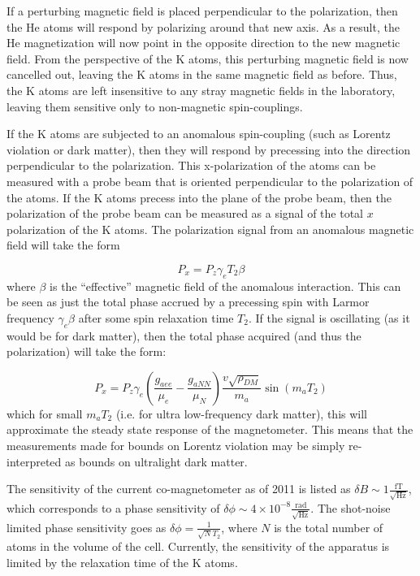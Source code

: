 \documentclass[aps,prd,final,letterpaper]{revtex4}
\begin{document}
If a perturbing magnetic field is placed perpendicular to the polarization, then the He atoms will respond by polarizing around that new axis. As a result, the He magnetization will now point in the opposite direction to the new magnetic field. From the perspective of the K atoms, this perturbing magnetic field is now cancelled out, leaving the K atoms in the same magnetic field as before. Thus, the K atoms are left insensitive to any stray magnetic fields in the laboratory, leaving them sensitive only to non-magnetic spin-couplings. 

If the K atoms are subjected to an anomalous spin-coupling (such as Lorentz violation or dark matter), then they will respond by precessing into the direction perpendicular to the polarization. This x-polarization of the atoms can be measured with a probe beam that is oriented perpendicular to the polarization of the atoms. If the K atoms precess into the plane of the probe beam, then the polarization of the probe beam can be measured as a signal of the total $x$ polarization of the K atoms. The polarization signal from an anomalous magnetic field will take the form 

\begin{equation}
P_x = P_z\gamma_e T_2\beta
\end{equation}
where $\beta$ is the ``effective'' magnetic field of the anomalous interaction. This can be seen as just the total phase accrued by a precessing spin with Larmor frequency $\gamma_e \beta$ after some spin relaxation time $T_2$. If the signal is oscillating (as it would be for dark matter), then the total phase acquired (and thus the polarization) will take the form:

\begin{equation}
P_x = P_z\gamma_e \left(\frac{g_{aee}}{\mu_e} - \frac{g_{aNN}}{\mu_N}\right)\frac{v\sqrt{\rho_{DM}}}{m_a}\sin{(m_a T_2)}
\end{equation}
which for small $m_a T_2$ (i.e. for ultra low-frequency dark matter), this will approximate the steady state response of the magnetometer. This means that the measurements made for bounds on Lorentz violation may be simply re-interpreted as bounds on ultralight dark matter. 

The sensitivity of the current co-magnetometer as of 2011 is listed as $\delta B \sim 1 \frac{\mathrm{fT}}{\sqrt{\mathrm{Hz}}}$, which corresponds to a phase sensitivity of $\delta \phi \sim 4\times 10^{-8} \frac{\mathrm{rad}}{\sqrt{\mathrm{Hz}}}$. The shot-noise limited phase sensitivity goes as $\delta \phi = \frac{1}{\sqrt{N}{T_2}}$, where $N$ is the total number of atoms in the volume of the cell. Currently, the sensitivity of the apparatus is limited by the relaxation time of the K atoms. 
\end{document}
